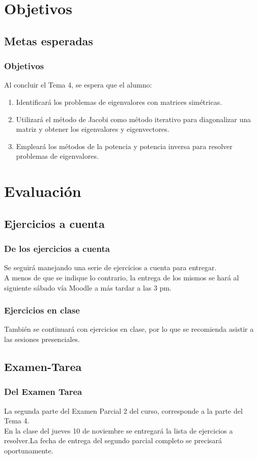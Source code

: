 \documentclass[12pt]{beamer}
\begin{document}
\section{Objetivos}
\subsection{Metas esperadas}

\begin{frame}
\frametitle{Objetivos}
Al concluir el Tema 4, se espera que el alumno:
\pause
{}
\begin{enumerate}[<+->] 
\item Identificará los problemas de eigenvalores con matrices simétricas.
\item Utilizará el método de Jacobi como método iterativo para diagonalizar una matriz y obtener los eigenvalores y eigenvectores.
\item Empleará los métodos de la potencia y potencia inversa para resolver problemas de eigenvalores.
\end{enumerate}
\end{frame}

\section{Evaluación}
\subsection{Ejercicios a cuenta}

\begin{frame}
\frametitle{De los ejercicios a cuenta}
Se seguirá manejando una serie de ejercicios a cuenta para entregar.
\\
\bigskip
\pause
A menos de que se indique lo contrario, la entrega de los mismos se hará al siguiente sábado vía Moodle a más tardar a las 3 pm.
\end{frame}
\begin{frame}
\frametitle{Ejercicios en clase}
También se continuará con ejercicios en clase, por lo que se recomienda asistir a las sesiones presenciales.
\end{frame}

\subsection{Examen-Tarea}

\begin{frame}
\frametitle{Del Examen Tarea}
La segunda parte del Examen Parcial 2 del curso, corresponde a la parte del Tema 4.
\\
\bigskip
\pause
En la clase del jueves 10 de noviembre se entregará la lista de ejercicios a resolver.\pause La fecha de entrega del segundo parcial completo se precisará oportunamente.
\end{frame}
\end{document}
